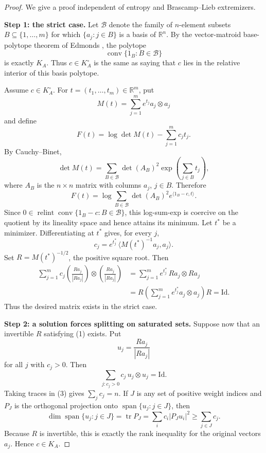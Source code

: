 \documentclass[11pt]{article}
\newcommand{\R}{\mathbb R}
\newcommand{\Id}{\mathrm{Id}}
\newcommand{\conv}{\operatorname{conv}}
\newcommand{\spanop}{\operatorname{span}}
\newcommand{\tr}{\operatorname{tr}}
\newcommand{\relint}{\operatorname{relint}}
\begin{document}
\begin{proof}
We give a proof independent of entropy and Brascamp--Lieb extremizers.

\medskip
\noindent\textbf{Step 1: the strict case.}
Let \(\mathcal B\) denote the family of \(n\)-element subsets
\(B\subseteq\{1,\ldots,m\}\) for which \(\{a_j:j\in B\}\) is a basis of
\(\R^n\).  By the vector-matroid base-polytope theorem of Edmonds
\cite{Edmonds}, the polytope
\[
  \conv\{1_B:B\in\mathcal B\}
\]
is exactly \(K_A\).  Thus \(c\in K_A^\circ\) is the same as saying that \(c\)
lies in the relative interior of this basis polytope.

Assume \(c\in K_A^\circ\).  For \(t=(t_1,\ldots,t_m)\in\R^m\), put
\[
  M(t)=\sum_{j=1}^m e^{t_j}a_j\otimes a_j
\]
and define
\[
  F(t)=\log\det M(t)-\sum_{j=1}^m c_jt_j.
\]
By Cauchy--Binet,
\[
  \det M(t)=
  \sum_{B\in\mathcal B} \det(A_B)^2
  \exp\left(\sum_{j\in B}t_j\right),
\]
where \(A_B\) is the \(n\times n\) matrix with columns \(a_j\), \(j\in B\).
Therefore
\[
  F(t)=
  \log\sum_{B\in\mathcal B}\det(A_B)^2
     e^{\langle 1_B-c,t\rangle}.
\]
Since \(0\in\relint\conv\{1_B-c:B\in\mathcal B\}\), this log-sum-exp is
coercive on the quotient by its lineality space and hence attains its minimum.
Let \(t^*\) be a minimizer.  Differentiating at \(t^*\) gives, for every \(j\),
\[
  c_j=e^{t_j^*}\,\langle M(t^*)^{-1}a_j,a_j\rangle.
  \tag{2}
\]
Set \(R=M(t^*)^{-1/2}\), the positive square root.  Then
\[
\begin{aligned}
 \sum_{j=1}^m c_j
 \left(\frac{Ra_j}{|Ra_j|}\right)\otimes
 \left(\frac{Ra_j}{|Ra_j|}\right)
 &= \sum_{j=1}^m
    e^{t_j^*}\, Ra_j\otimes Ra_j \\
 &= R\left(\sum_{j=1}^m e^{t_j^*}a_j\otimes a_j\right)R
  = \Id.
\end{aligned}
\]
Thus the desired matrix exists in the strict case.

\medskip
\noindent\textbf{Step 2: a solution forces splitting on saturated sets.}
Suppose now that an invertible \(R\) satisfying (1) exists.  Put
\[
  u_j=\frac{Ra_j}{|Ra_j|}
\]
for all \(j\) with \(c_j>0\).  Then
\[
  \sum_{j:c_j>0}c_j\,u_j\otimes u_j=\Id.
  \tag{3}
\]
Taking traces in (3) gives \(\sum_jc_j=n\).  If \(J\) is any set of positive
weight indices and \(P_J\) is the orthogonal projection onto
\(\spanop\{u_j:j\in J\}\), then
\[
  \dim\spanop\{u_j:j\in J\}
  =\tr P_J
  =\sum_i c_i |P_Ju_i|^2
  \ge \sum_{j\in J}c_j.
  \tag{4}
\]
Because \(R\) is invertible, this is exactly the rank inequality for the
original vectors \(a_j\).  Hence \(c\in K_A\).


\end{proof}
\end{document}
